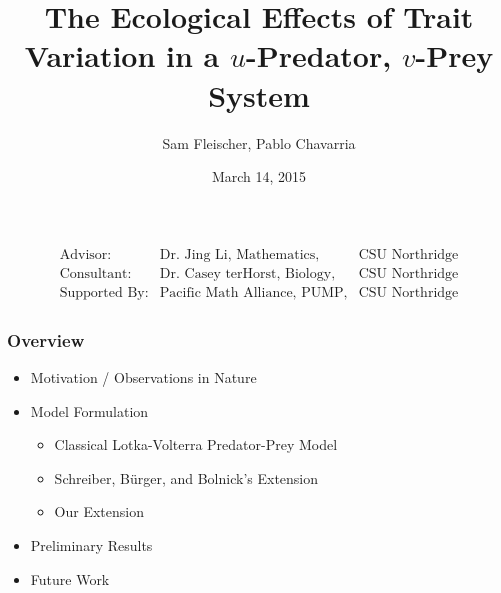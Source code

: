 \documentclass[10pt]{beamer}
\title{The Ecological Effects of Trait Variation in a $u$-Predator, $v$-Prey System}
\author{Sam Fleischer, Pablo Chavarria}
\date{March 14, 2015}
\begin{document}
\begin{frame}
	\titlepage
	\begin{align*}
		\begin{array}{lll}
		\text{Advisor:} & \text{Dr. Jing Li, Mathematics,} & \text{CSU Northridge} \\
		\text{Consultant:} & \text{Dr. Casey terHorst, Biology,} & \text{CSU Northridge} \\
		\text{Supported By:} & \text{Pacific Math Alliance, PUMP,} & \text{CSU Northridge}
		\end{array}
	\end{align*}
\end{frame}

\begin{frame}
	\frametitle{Overview}
	\begin{itemize}
		\item Motivation / Observations in Nature
		\item Model Formulation
		\begin{itemize}
			\item Classical Lotka-Volterra Predator-Prey Model
			\item Schreiber, B\"urger, and Bolnick's Extension
			\item Our Extension
		\end{itemize}
		\item Preliminary Results
		\item Future Work
	\end{itemize}
\end{frame}
\end{document}
